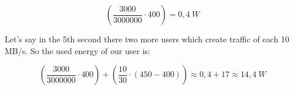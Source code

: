     $$(\frac{3000}{3000000} \cdot 400) = 0,4\ W $$
    
    Let's say in the 5th second there two more users which create traffic of each 10 MB/s. So the used energy of our user is:
    
     $$(\frac{3000}{3000000} \cdot 400) + (\frac{10}{30} \cdot (450 - 400))  \approx 0,4 + 17 \approx 14,4\ W $$
           
  